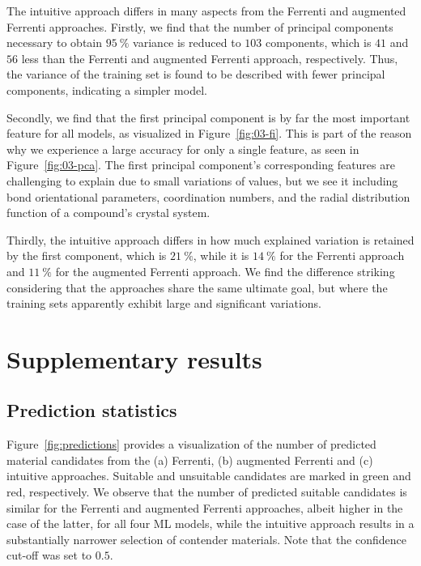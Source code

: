 \documentclass[superscriptaddress,unsortedaddress,
 amsmath,amssymb,
 aps,
]{revtex4-2}
\begin{document}
The intuitive approach differs in many aspects from the Ferrenti and augmented Ferrenti approaches. Firstly, we find that the number of principal components necessary to obtain $95 \ \%$ variance is reduced to $103$ components, which is $41$ and $56$ less than the Ferrenti and augmented Ferrenti approach, respectively. Thus, the variance of the training set is found to be described with fewer principal components, indicating a simpler model.   

Secondly, we find that the first principal component is by far the most important feature for all models, as visualized in Figure~\ref{fig:03-fi}. This is part of the reason why we experience a large accuracy for only a single feature, as seen in Figure~\ref{fig:03-pca}. The first principal component's corresponding features are challenging to explain due to small variations of values, but we see it including 
bond orientational parameters, coordination numbers, and the radial distribution function of a compound's crystal system.

Thirdly, the intuitive approach differs in how much explained variation is retained by the first component, which is $21 \ \%$, while it is $14 \ \%$ for the Ferrenti approach and $11 \ \%$ for the augmented Ferrenti approach. We find the difference striking considering that the approaches share the same ultimate goal, but where the training sets apparently exhibit large and significant variations. 



\section*{Supplementary results} 

\subsection*{Prediction statistics}

Figure~\ref{fig:predictions} provides a visualization of the number of predicted material candidates from the (a) Ferrenti, (b) augmented Ferrenti and (c) intuitive approaches. Suitable and unsuitable candidates are marked in green and red, respectively. We observe that the number of predicted suitable candidates is similar for the Ferrenti and augmented Ferrenti approaches, albeit higher in the case of the latter, for all four ML models, while the intuitive approach results in a substantially narrower selection of contender materials. Note that the confidence cut-off was set to $0.5$. 
\end{document}
